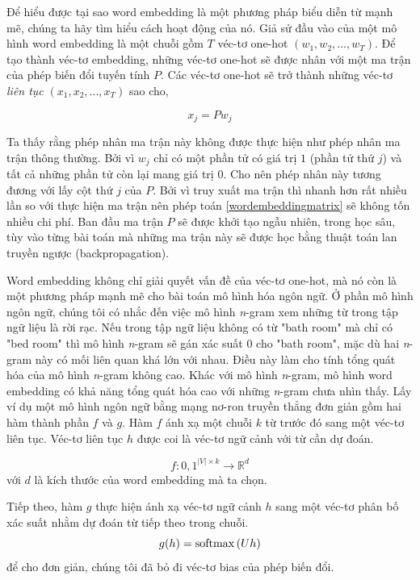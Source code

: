 Để hiểu được tại sao word embedding là một phương pháp biểu diễn từ mạnh mẽ, chúng ta hãy tìm hiểu cách hoạt động của nó. Giả sử đầu vào của một mô hình word embedding là một chuỗi gồm $T$ véc-tơ one-hot $(w_1,w_2,...,w_{T})$. Để tạo thành véc-tơ embedding, những véc-tơ one-hot sẽ được nhân với một ma trận của phép biến đổi tuyến tính $P$. Các véc-tơ one-hot sẽ trở thành những véc-tơ \textit{liên tục} $(x_1, x_2,...,x_{T})$ sao cho,

\begin{equation} \label{wordembeddingmatrix}
	x_j = Pw_j
\end{equation}

Ta thấy rằng phép nhân ma trận này không được thực hiện như phép nhân ma trận thông thường. Bởi vì $w_j$ chỉ có một phần tử có giá trị $1$ (phần tử thứ $j$) và tất cả những phần tử còn lại mang giá trị $0$. Cho nên phép nhân này tương đương với lấy cột thứ $j$ của $P$. Bởi vì truy xuất ma trận thì nhanh hơn rất nhiều lần so với thực hiện ma trận nên phép toán \ref{wordembeddingmatrix} sẽ không tốn nhiều chi phí. Ban đầu ma trận $P$ sẽ được khởi tạo ngẫu nhiên, trong học sâu, tùy vào từng bài toán mà những ma trận này sẽ được học bằng thuật toán lan truyền ngược (backpropagation).

Word embedding không chỉ giải quyết vấn đề của véc-tơ one-hot, mà nó còn là một phương pháp mạnh mẽ cho bài toán mô hình hóa ngôn ngữ. Ở phần mô hình ngôn ngữ, chúng tôi có nhắc đến việc mô hình \textit{n}-gram xem những từ trong tập ngữ liệu là rời rạc. Nếu trong tập ngữ liệu không có từ "bath room" mà chỉ có "bed room" thì mô hình \textit{n}-gram sẽ gán xác suất $0$ cho "bath room", mặc dù hai \textit{n}-gram này có mối liên quan khá lớn với nhau. Điều này làm cho tính tổng quát hóa của mô hình \textit{n}-gram không cao. Khác với mô hình \textit{n}-gram, mô hình word embedding có khả năng tổng quát hóa cao với những \textit{n}-gram chưa nhìn thấy. Lấy ví dụ một mô hình ngôn ngữ bằng mạng nơ-ron truyền thẳng đơn giản gồm hai hàm thành phần $f$ và $g$. Hàm $f$ ánh xạ một chuỗi $k$ từ trước đó sang một véc-tơ liên tục. Véc-tơ liên tục $h$ được coi là véc-tơ ngữ cảnh với từ cần dự đoán.

\begin{equation} \label{contextvectorfnnlm1}
f: {0,1}^{|V| \times k} \rightarrow \mathbb{R}^{d}
\end{equation}
với $d$ là kích thước của word embedding mà ta chọn.

Tiếp theo, hàm $g$ thực hiện ánh xạ véc-tơ ngữ cảnh $h$ sang một véc-tơ phân bố xác suất nhằm dự đoán từ tiếp theo trong chuỗi.
\begin{equation} \label{contextvectorfnnlm2}
g(h) = \mathrm{softmax} \left(Uh \right)
\end{equation}
để cho đơn giản, chúng tôi đã bỏ đi véc-tơ bias của phép biến đổi.

